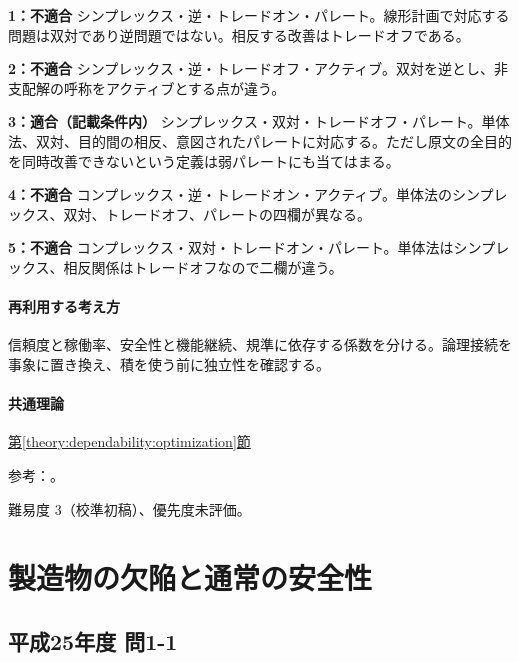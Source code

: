 \noindent\textbf{1：不適合} シンプレックス・逆・トレードオン・パレート。線形計画で対応する問題は双対であり逆問題ではない。相反する改善はトレードオフである。\par

\noindent\textbf{2：不適合} シンプレックス・逆・トレードオフ・アクティブ。双対を逆とし、非支配解の呼称をアクティブとする点が違う。\par

\noindent\textbf{3：適合（記載条件内）} シンプレックス・双対・トレードオフ・パレート。単体法、双対、目的間の相反、意図されたパレートに対応する。ただし原文の全目的を同時改善できないという定義は弱パレートにも当てはまる。\par

\noindent\textbf{4：不適合} コンプレックス・逆・トレードオン・アクティブ。単体法のシンプレックス、双対、トレードオフ、パレートの四欄が異なる。\par

\noindent\textbf{5：不適合} コンプレックス・双対・トレードオン・パレート。単体法はシンプレックス、相反関係はトレードオフなので二欄が違う。\par

\paragraph{再利用する考え方} 信頼度と稼働率、安全性と機能継続、規準に依存する係数を分ける。論理接続を事象に置き換え、積を使う前に独立性を確認する。

\paragraph{共通理論} \hyperref[theory:dependability:optimization]{第\ref*{theory:dependability:optimization}節}

\par 参考：\cite{design_mit_lp}。

\par 難易度 3（校準初稿）、優先度未評価。

\section{製造物の欠陥と通常の安全性}

\subsection{平成25年度 問1-1}
\label{q:h25-reg-basic-1-1}

